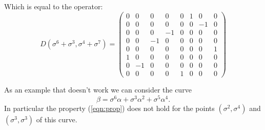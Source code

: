\documentclass[a4paper]{article}
\begin{document}
  Which is equal to the operator:
  \begin{equation}
    D(\sigma^6+\sigma^3,\sigma^4 +\sigma^7) = 
    \displaystyle \left(\begin{array}{rrrrrrrr}
    0 & 0 & 0 & 0 & 0 & 1 & 0 & 0 \\
    0 & 0 & 0 & 0 & 0 & 0 & -1 & 0 \\
    0 & 0 & 0 & -1 & 0 & 0 & 0 & 0 \\
    0 & 0 & -1 & 0 & 0 & 0 & 0 & 0 \\
    0 & 0 & 0 & 0 & 0 & 0 & 0 & 1 \\
    1 & 0 & 0 & 0 & 0 & 0 & 0 & 0 \\
    0 & -1 & 0 & 0 & 0 & 0 & 0 & 0 \\
    0 & 0 & 0 & 0 & 1 & 0 & 0 & 0
    \end{array}\right)
  \end{equation}

  As an example that doesn't work we can consider the curve
  \begin{equation}
    \beta
    = \sigma^6 \alpha + \sigma^3 \alpha^2 + \sigma^5 \alpha^4.
  \end{equation}
  In particular the property (\ref{eqn:prop}) does not hold
  for the points $(\sigma^2,\sigma^4)$ and
  $(\sigma^3,\sigma^3)$ of this curve.
\end{document}
